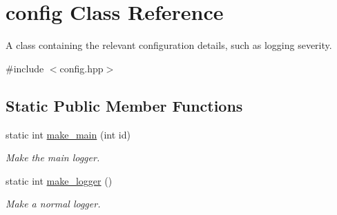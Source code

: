 \hypertarget{classconfig}{\section{config Class Reference}
\label{classconfig}
}


A class containing the relevant configuration details, such as logging severity.  




{\ttfamily \#include $<$config.\-hpp$>$}

\subsection*{Static Public Member Functions}
\begin{DoxyCompactItemize}
\item 
static int \hyperlink{classconfig_a73708a7bb36013b7517f9a0851c0f85e}{make\-\_\-main} (int id)
\begin{DoxyCompactList}\small\item\em Make the main logger. \end{DoxyCompactList}\item 
static int \hyperlink{classconfig_a07c0a064b4084414030a0d1859ffb47b}{make\-\_\-logger} ()
\begin{DoxyCompactList}\small\item\em Make a normal logger. \end{DoxyCompactList}\end{DoxyCompactItemize}
